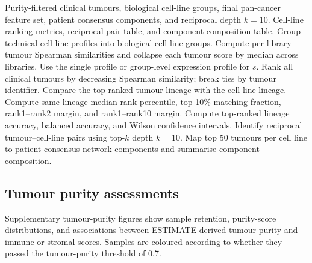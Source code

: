 \begin{algorithm}[H]
\caption{Cell-line-to-tumour similarity ranking}
\label{alg:supp_cellline_tumour_class_similarity}
\label{alg:supp_cell_line_centred_tumour_retrieval}
\small
\begin{algorithmic}[1]
\Require Purity-filtered clinical tumours, biological cell-line groups, final pan-cancer feature set, patient consensus components, and reciprocal depth \(k=10\).
\Ensure Cell-line ranking metrics, reciprocal pair table, and component-composition table.
\State Group technical cell-line profiles into biological cell-line groups.
    \State Compute per-library tumour Spearman similarities and collapse each tumour score by median across libraries.
  \Else
    \State Use the single profile or group-level expression profile for \(s\).
  \EndIf
  \State Rank all clinical tumours by decreasing Spearman similarity; break ties by tumour identifier.
  \State Compare the top-ranked tumour lineage with the cell-line lineage.
  \State Compute same-lineage median rank percentile, top-10\% matching fraction, rank1--rank2 margin, and rank1--rank10 margin.
\EndFor
\State Compute top-ranked lineage accuracy, balanced accuracy, and Wilson confidence intervals.
\State Identify reciprocal tumour--cell-line pairs using top-\(k\) depth \(k=10\).
\State Map top 50 tumours per cell line to patient consensus network components and summarise component composition.
\end{algorithmic}
\end{algorithm}

\subsection{Tumour purity assessments}

Supplementary tumour-purity figures show sample retention, purity-score distributions, and associations between ESTIMATE-derived tumour purity and immune or stromal scores. Samples are coloured according to whether they passed the tumour-purity threshold of 0.7.

